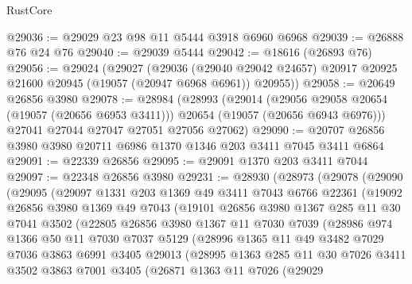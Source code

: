 \begin{lexlean}{RustCore}
\begin{coremodule}
@29036 := @29029 @23 @98 @11 @5444 @3918 @6960 @6968
@29039 := @26888 @76 @24 @76
@29040 := @29039 @5444
@29042 := @18616 (@26893 @76)
@29056 := @29024
    (@29027
      (@29036
        (@29040 @29042 @24657)
        @20917
        @20925
        @21600
        @20945
        (@19057 (@20947 @6968 @6961))
        @20955))
@29058 := @20649 @26856 @3980
@29078 := @28984
    (@28993
      (@29014
        (@29056 @29058 @20654 (@19057 (@20656 @6953 @3411)))
        @20654
        (@19057 (@20656 @6943 @6976)))
      @27041
      @27044
      @27047
      @27051
      @27056
      @27062)
@29090 := @20707 @26856 @3980 @3980 @20711 @6986 @1370 @1346 @203 @3411 @7045 @3411 @6864
@29091 := @22339 @26856
@29095 := @29091 @1370 @203 @3411 @7044
@29097 := @22348 @26856 @3980
@29231 := @28930
    (@28973
      (@29078
        (@29090
          (@29095
            (@29097
              @1331
              @203
              @1369
              @49
              @3411
              @7043
              @6766
              @22361
              (@19092
                @26856
                @3980
                @1369
                @49
                @7043
                (@19101
                  @26856
                  @3980
                  @1367
                  @285
                  @11
                  @30
                  @7041
                  @3502
                  (@22805
                    @26856
                    @3980
                    @1367
                    @11
                    @7030
                    @7039
                    (@28986
                      @974
                      @1366
                      @50
                      @11
                      @7030
                      @7037
                      @5129
                      (@28996
                        @1365
                        @11
                        @49
                        @3482
                        @7029
                        @7036
                        @3863
                        @6991
                        @3405
                        @29013
                        (@28995
                          @1363
                          @285
                          @11
                          @30
                          @7026
                          @3411
                          @3502
                          @3863
                          @7001
                          @3405
                          (@26871
                            @1363
                            @11
                            @7026
                            (@29029

\end{coremodule}
\end{lexlean}
